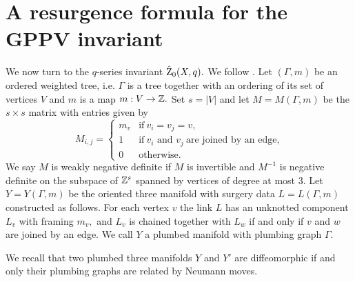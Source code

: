  \section{A resurgence formula for the GPPV invariant }  \label{sec:Zhat}
  
  We now turn to the $q$-series invariant $\hat{\operatorname{Z}}_0(X,q).$  We follow \cite{GukovCiprian19}. Let $(\Gamma,m)$ be an ordered weighted tree, i.e. $\Gamma$ is a tree together with an ordering of its set of vertices $V$ and $m$ is a map $m:V\rightarrow \mathbb{Z}.$  Set $s=\lvert V \rvert$ and let $M=M(\Gamma,m)$ be the $s\times s$ matrix with entries given by
  $$M_{i,j}= \begin{cases} m_v & \text{if} \ v_i=v_j=v,
  \\ 1 & \text{if}  \ v_i \text{ and }  v_j \ \text{are joined by an edge,}
  \\ 0 & \text{otherwise.} \end{cases}$$
  We say $M$ is weakly negative definite if $M$ is invertible and $M^{-1}$ is negative definite on the subspace of $\mathbb{Z}^s$ spanned by vertices of degree at most $3.$ Let $Y=Y(\Gamma,m)$ be the oriented three manifold with surgery data $L=L(\Gamma,m)$ constructed as follows. For each vertex $v$ the link $L$ has an unknotted component $L_v$ with framing $m_v,$ and $L_v$ is chained together with $L_w$ if and only if $v$ and $w$ are joined by an edge. We call $Y$ a plumbed manifold with plumbing graph $\Gamma.$
  
  We recall that two plumbed three manifolds $Y$ and $Y'$ are diffeomorphic if and only their plumbing graphs are related by Neumann moves. 
  
